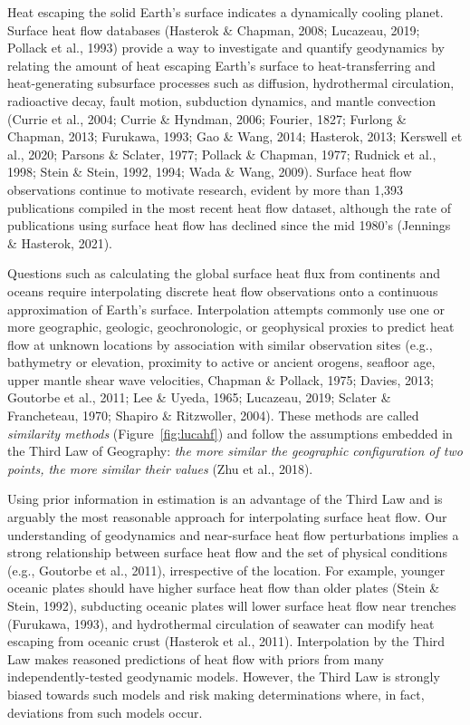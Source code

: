 \documentclass[draft,linenumbers]{agujournal2018}
\begin{document}
Heat escaping the solid Earth's surface indicates a dynamically cooling
planet. Surface heat flow databases (Hasterok \& Chapman, 2008;
Lucazeau, 2019; Pollack et al., 1993) provide a way to investigate and
quantify geodynamics by relating the amount of heat escaping Earth's
surface to heat-transferring and heat-generating subsurface processes
such as diffusion, hydrothermal circulation, radioactive decay, fault
motion, subduction dynamics, and mantle convection (Currie et al., 2004;
Currie \& Hyndman, 2006; Fourier, 1827; Furlong \& Chapman, 2013;
Furukawa, 1993; Gao \& Wang, 2014; Hasterok, 2013; Kerswell et al.,
2020; Parsons \& Sclater, 1977; Pollack \& Chapman, 1977; Rudnick et
al., 1998; Stein \& Stein, 1992, 1994; Wada \& Wang, 2009). Surface heat
flow observations continue to motivate research, evident by more than
1,393 publications compiled in the most recent heat flow dataset,
although the rate of publications using surface heat flow has declined
since the mid 1980's (Jennings \& Hasterok, 2021).

Questions such as calculating the global surface heat flux from
continents and oceans require interpolating discrete heat flow
observations onto a continuous approximation of Earth's surface.
Interpolation attempts commonly use one or more geographic, geologic,
geochronologic, or geophysical proxies to predict heat flow at unknown
locations by association with similar observation sites (e.g.,
bathymetry or elevation, proximity to active or ancient orogens,
seafloor age, upper mantle shear wave velocities, Chapman \& Pollack,
1975; Davies, 2013; Goutorbe et al., 2011; Lee \& Uyeda, 1965; Lucazeau,
2019; Sclater \& Francheteau, 1970; Shapiro \& Ritzwoller, 2004). These
methods are called \emph{similarity methods} (Figure~\ref{fig:lucahf})
and follow the assumptions embedded in the Third Law of Geography:
\emph{the more similar the geographic configuration of two points, the
more similar their values} (Zhu et al., 2018).

Using prior information in estimation is an advantage of the Third Law
and is arguably the most reasonable approach for interpolating surface
heat flow. Our understanding of geodynamics and near-surface heat flow
perturbations implies a strong relationship between surface heat flow
and the set of physical conditions (e.g., Goutorbe et al., 2011),
irrespective of the location. For example, younger oceanic plates should
have higher surface heat flow than older plates (Stein \& Stein, 1992),
subducting oceanic plates will lower surface heat flow near trenches
(Furukawa, 1993), and hydrothermal circulation of seawater can modify
heat escaping from oceanic crust (Hasterok et al., 2011). Interpolation
by the Third Law makes reasoned predictions of heat flow with priors
from many independently-tested geodynamic models. However, the Third Law
is strongly biased towards such models and risk making determinations
where, in fact, deviations from such models occur.
\end{document}
